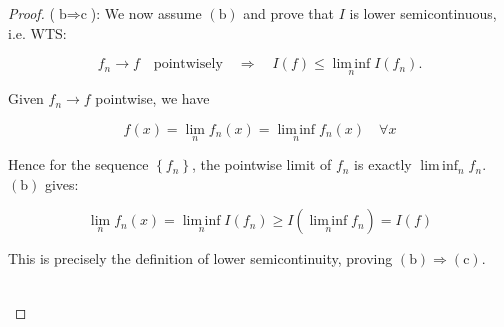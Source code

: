 \documentclass{qlnotes-export}
\begin{document}
\begin{proof}

(\(\text{b}\Longrightarrow\text{c}\)): We now assume \((\text{b})\) and prove that \(I\) is lower semicontinuous, i.e. WTS:

\[f_{n}\rightarrow f\quad\text{pointwisely}\quad\Rightarrow\quad I(f) \leq \operatorname{lim\, inf}\limits_{n}I(f_{n}).\]

Given \(f_{n}\rightarrow f\) pointwise, we have

\[f(x) = \lim\limits_{n}f_{n}(x) = \operatorname{lim\, inf}\limits_{n}f_{n}(x)\quad\forall x\]

Hence for the sequence \(\left\{ f_{n} \right\}\), the pointwise limit of \(f_{n}\) is exactly \(\operatorname{lim\, inf}_{n}f_{n}\). \((\text{b})\) gives:

\[\lim\limits_{n}f_{n}(x) = \operatorname{lim\, inf}\limits_{n}I(f_{n}) \geq I(\operatorname{lim\, inf}\limits_{n}f_{n}) = I(f)\]

This is precisely the definition of lower semicontinuity, proving \((\text{b})\Longrightarrow(\text{c})\).\\
\strut \\

\end{proof}
\end{document}
